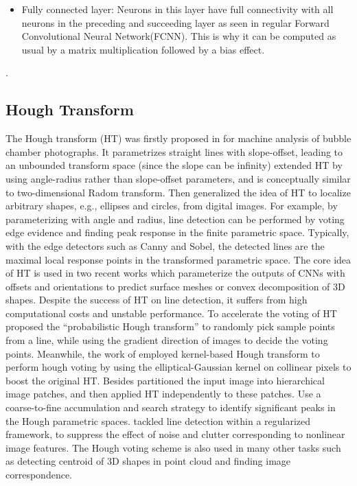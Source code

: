 \begin{itemize}
\item Fully connected layer: Neurons in this layer have full connectivity with all neurons in the preceding and succeeding layer as seen in regular Forward Convolutional Neural Network(FCNN). This is why it can be computed as usual by a matrix multiplication followed by a bias effect.
\end{itemize} .\\

\subsection{Hough Transform}
The Hough transform (HT) was firstly proposed in for machine analysis of bubble chamber photographs. It parametrizes straight lines with slope-offset, leading to an unbounded transform space (since the slope can be infinity) extended HT by using angle-radius rather than slope-offset parameters, and is conceptually similar to two-dimensional Radom transform. Then generalized the idea of HT to localize arbitrary shapes, e.g., ellipses and circles, from digital images. For example, by parameterizing with angle and radius, line detection can be performed by voting edge evidence and finding peak response in the finite parametric space. Typically, with the edge detectors such as Canny  and Sobel, the detected lines are the maximal local response points in the transformed parametric space. The core idea of HT is used in two recent works which parameterize the outputs of CNNs with offsets and orientations to predict surface meshes  or convex decomposition of 3D shapes. Despite the success of HT on line detection, it suffers from high computational costs and unstable performance. To accelerate the voting of HT proposed the “probabilistic Hough transform” to randomly pick sample points from a line, while  using the gradient direction of images to decide the voting points. Meanwhile, the work of employed kernel-based Hough transform to perform hough voting by using the elliptical-Gaussian kernel on collinear pixels to boost the original HT. Besides partitioned the input image into hierarchical image patches, and then applied HT independently to these patches. Use a coarse-to-fine accumulation and search strategy to identify significant peaks in the Hough parametric spaces. tackled line detection within a regularized framework, to suppress the effect of noise and clutter corresponding to nonlinear image features. The Hough voting scheme is also used in many other tasks such as detecting centroid of 3D shapes in point cloud and finding image correspondence.


